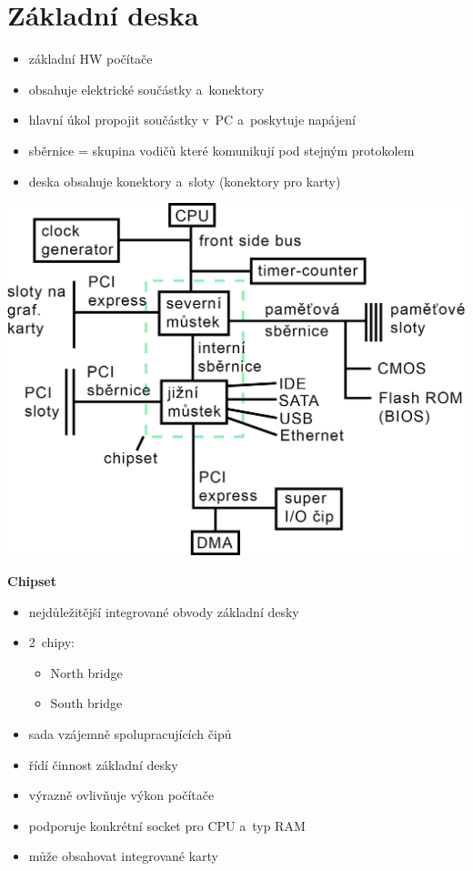 \documentclass[a4paper,12pt]{article}
\providecommand{\tightlist}{%
\setlength{\itemsep}{0pt}\setlength{\parskip}{0pt}}
\begin{document}
\section{Základní deska}

\begin{itemize}
  \tightlist
  \item základní HW počítače
  \item obsahuje elektrické součástky a~konektory
  \item hlavní úkol propojit součástky v~PC a~poskytuje napájení
  \item sběrnice = skupina vodičů které komunikují pod stejným protokolem
  \item deska obsahuje konektory a~sloty (konektory pro karty)
\end{itemize}

\includegraphics{ref/blokove-schema-zakladni-desky.png}

\textbf{Chipset}

\begin{itemize}
  \tightlist
  \item nejdůležitější integrované obvody základní desky
  \item 2~chipy:
  \begin{itemize}
    \tightlist
    \item North bridge
    \item South bridge
  \end{itemize}
  \item sada vzájemně spolupracujících čipů
  \item řídí činnost základní desky
  \item výrazně ovlivňuje výkon počítače
  \item podporuje konkrétní socket pro CPU a~typ RAM
  \item může obsahovat integrované karty
\end{itemize}
\end{document}
